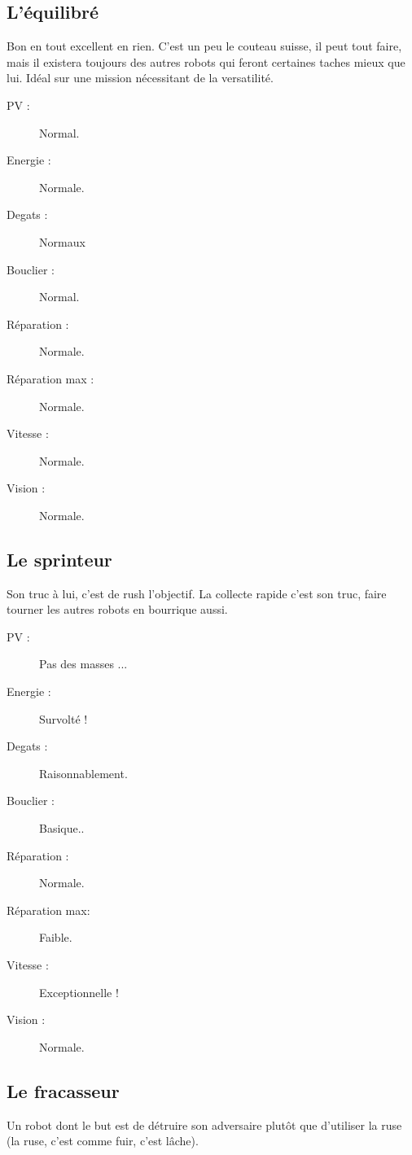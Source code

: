 \documentclass[10pt]{article}
\begin{document}
\subsection{L'équilibré}

Bon en tout excellent en rien. C'est un peu le couteau suisse, il peut tout faire, mais il existera toujours des autres robots qui feront certaines taches mieux que lui. Idéal sur une mission nécessitant de la versatilité.

\begin{description}
\item[PV :] Normal.
\item[Energie :] Normale.
\item[Degats :] Normaux
\item[Bouclier :] Normal.
\item[Réparation :] Normale.
\item[Réparation max :] Normale.
\item[Vitesse :] Normale.
\item[Vision :] Normale.
\end{description}

\subsection{Le sprinteur}

Son truc à lui, c'est de rush l'objectif. La collecte rapide c'est son truc, faire tourner les autres robots en bourrique aussi.

\begin{description}
\item[PV :] Pas des masses ...
\item[Energie :] Survolté !
\item[Degats :] Raisonnablement.
\item[Bouclier :] Basique..
\item[Réparation :] Normale.
\item[Réparation max:] Faible.
\item[Vitesse :] Exceptionnelle !
\item[Vision :] Normale.
\end{description} 

\subsection{Le fracasseur}

Un robot dont le but est de détruire son adversaire plutôt que d'utiliser la ruse (la ruse, c'est comme fuir, c'est lâche).
\end{document}
